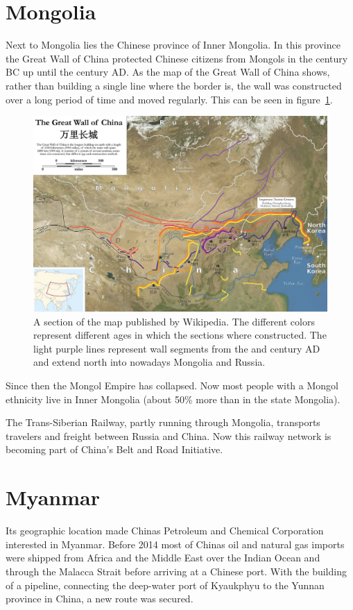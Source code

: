 \documentclass[conference]{IEEEtran}
\begin{document}
	\section{Mongolia}
	Next to Mongolia lies the Chinese province of Inner Mongolia. In this province the Great Wall of China protected Chinese citizens from Mongols in the  century BC up until the  century AD\cite{worldAtlas_whyWasTheGreatWallOfChinaBuilt}. As the map of the Great Wall of China shows, rather than building a single line where the border is, the wall was constructed over a long period of time and moved regularly. This can be seen in figure~\ref{pic:mongolia_greatWallOfChina}.
	
	\begin{figure}[t]
		\centering
		\includegraphics[width=\linewidth]{img/mongolia_greatWallOfChina.png}
		\caption{A section of the map published by Wikipedia\cite{wp_greatWallOfChina}. The different colors represent different ages in which the sections where constructed. The light purple lines represent wall segments from the  and  century AD and extend north into nowadays Mongolia and Russia.}
		\label{pic:mongolia_greatWallOfChina}
	\end{figure}

	Since then the Mongol Empire has collapsed. Now most people with a Mongol ethnicity live in Inner Mongolia (about 50\% more than in the state Mongolia).
	
	The Trans-Siberian Railway, partly running through Mongolia, transports travelers and freight between Russia and China. Now this railway network is becoming part of China's Belt and Road Initiative.
	
	\section{Myanmar}
	Its geographic location made Chinas Petroleum and Chemical Corporation interested in Myanmar. Before 2014 most of Chinas oil and natural gas imports were shipped from Africa and the Middle East over the Indian Ocean and through the Malacca Strait before arriving at a Chinese port. With the building of a pipeline, connecting the deep-water port of Kyaukphyu to the Yunnan province in China, a new route was secured\cite{chinaDaily_oilStartsFlowingThroughChinaMyanmarPipeline}.
	
\end{document}
